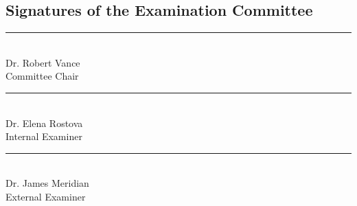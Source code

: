 \vspace{1.5cm}

\subsection*{Signatures of the Examination Committee}
\vspace{1.5cm}

\noindent
\begin{minipage}[t]{0.3\textwidth}
  \rule{\textwidth}{0.5pt}\\
  Dr. Robert Vance\\
  Committee Chair
\end{minipage}
\hfill
\begin{minipage}[t]{0.3\textwidth}
  \rule{\textwidth}{0.5pt}\\
  Dr. Elena Rostova\\
  Internal Examiner
\end{minipage}
\hfill
\begin{minipage}[t]{0.3\textwidth}
  \rule{\textwidth}{0.5pt}\\
  Dr. James Meridian\\
  External Examiner
\end{minipage}
